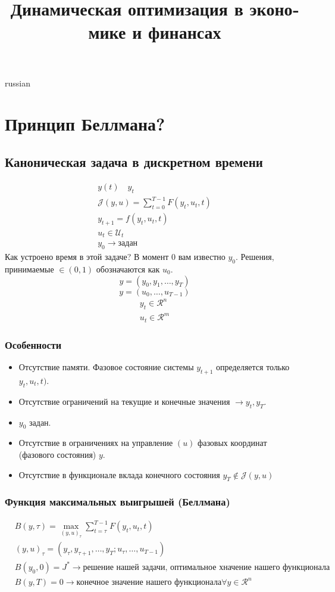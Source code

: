 \documentclass{article}
\begin{document}
\title{\foreignlanguage{russian}{Динамическая оптимизация в экономике и финансах}}
\maketitle

\begin{otherlanguage*}{russian}
\section*{Принцип Беллмана?}
\subsection*{\foreignlanguage{russian}{Каноническая задача в дискретном времени}}
\begin{align*}
y(t) \,\,\,\,\,\, y_t \\
\mathcal{J} (y, u) = \sum_{t=0}^{T-1} F(y_t, u_t, t) \\
y_{t+1} = f(y_t, u_t, t) \\
u_t \in \mathcal{U}_t \\
y_0 \rightarrow \text{задан} 
\end{align*}
Как устроено время в этой задаче? 
В момент $ 0 $ вам известно $ y_0 $. Решения, принимаемые $ \in (0, 1) $ обозначаются как $ u_0 $. 
$$ y = (y_0, y_1, \ldots, y_T) $$ 
$$ y = (u_0, \ldots, u_{T-1}) $$
\begin{align*}
y_t \in \mathcal{R}^n \\
u_t \in \mathcal{R}^m 
\end{align*}
\subsubsection*{Особенности}
\begin{itemize}
\item Отсутствие памяти. Фазовое состояние системы $ y_{t+1} $ определяется только $ y_t, u_t, t) $. 
\item Отсутствие ограничений на текущие и конечные значения $ \rightarrow y_t, y_T $.
\item $ y_0 $ задан. 
\item Отсутствие в ограничениях на управление $ (u) $ фазовых координат (фазового состояния) $ y$.  
\item Отсутствие в функционале вклада конечного состояния $ y_T \notin \mathcal{J} (y, u) $ 
\end{itemize}
\subsubsection*{Функция максимальных выигрышей (Беллмана)}
\begin{align*}
& B(y, \tau) = \max_{(y, u)_\tau} \sum_{t=\tau}^{T-1} F( y_t, u_t, t) \\
& (y, u)_{\tau} = (y_\tau, y_{\tau + 1}, \ldots, y_T; u_\tau, \ldots, u_{T-1} ) \\
& B(y_0, 0) = J^* \rightarrow \text{решение нашей задачи, оптимальное хначение нашего функционала} \\
& B(y, T) = 0 \rightarrow \text{конечное значение нашего функционала} \forall y \in \mathcal{R}^n 
\end{align*}

\end{otherlanguage*}
\end{document}
